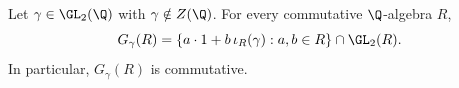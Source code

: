 Let $\gamma\in\GL_2(\Q)$ with $\gamma\notin Z(\Q)$. For every commutative $\Q$-algebra $R$,
\[
  G_\gamma(R)=\{a\cdot1+b\,\iota_R(\gamma):a,b\in R\}\cap\GL_2(R).
\]
In particular, $G_\gamma(R)$ is commutative.
